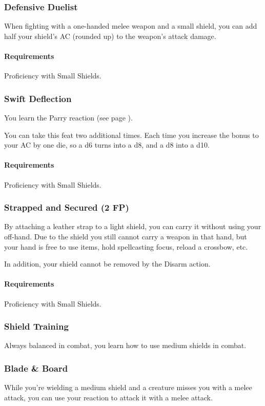 \subsubsection{Defensive Duelist} \label{feat::defensiveduelist}
    When fighting with a one-handed melee weapon and a small shield, you can add half your shield's AC (rounded up) to the weapon's attack damage.
    \paragraph{Requirements} Proficiency with Small Shields.
\subsubsection{Swift Deflection} \label{feat::swiftdeflection}
    You learn the Parry reaction (see page \pageref{act::parry}).

    You can take this feat two additional times.
    Each time you increase the bonus to your AC by one die, so a d6 turns into a d8, and a d8 into a d10.
    \paragraph{Requirements} Proficiency with Small Shields.
\subsubsection{Strapped and Secured (2 FP)} \label{feat::strappedandsecured}
    By attaching a leather strap to a light shield, you can carry it without using your off-hand.
    Due to the shield you still cannot carry a weapon in that hand, but your hand is free to use items, hold spellcasting focus, reload a crossbow, etc.

    In addition, your shield cannot be removed by the Disarm action.
    \paragraph{Requirements} Proficiency with Small Shields.
\subsubsection{Shield Training} \label{feat::shieldtraining}
    Always balanced in combat, you learn how to use medium shields in combat.
\subsubsection{Blade \& Board} \label{feat::bladeandboard}
    While you're wielding a medium shield and a creature misses you with a melee attack, you can use your reaction to attack it with a melee attack.

